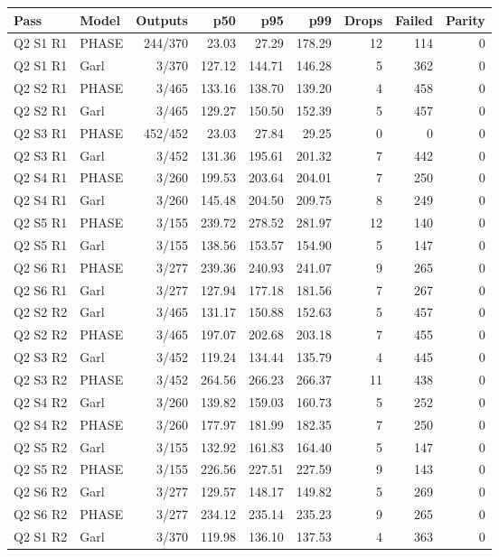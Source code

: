 \begin{longtable}{llrrrrrrr}
\toprule
Pass & Model & Outputs & p50 & p95 & p99 & Drops & Failed & Parity \\
\midrule
\endhead
Q2 S1 R1 & PHASE & 244/370 & 23.03 & 27.29 & 178.29 & 12 & 114 & 0 \\
Q2 S1 R1 & Garl & 3/370 & 127.12 & 144.71 & 146.28 & 5 & 362 & 0 \\
Q2 S2 R1 & PHASE & 3/465 & 133.16 & 138.70 & 139.20 & 4 & 458 & 0 \\
Q2 S2 R1 & Garl & 3/465 & 129.27 & 150.50 & 152.39 & 5 & 457 & 0 \\
Q2 S3 R1 & PHASE & 452/452 & 23.03 & 27.84 & 29.25 & 0 & 0 & 0 \\
Q2 S3 R1 & Garl & 3/452 & 131.36 & 195.61 & 201.32 & 7 & 442 & 0 \\
Q2 S4 R1 & PHASE & 3/260 & 199.53 & 203.64 & 204.01 & 7 & 250 & 0 \\
Q2 S4 R1 & Garl & 3/260 & 145.48 & 204.50 & 209.75 & 8 & 249 & 0 \\
Q2 S5 R1 & PHASE & 3/155 & 239.72 & 278.52 & 281.97 & 12 & 140 & 0 \\
Q2 S5 R1 & Garl & 3/155 & 138.56 & 153.57 & 154.90 & 5 & 147 & 0 \\
Q2 S6 R1 & PHASE & 3/277 & 239.36 & 240.93 & 241.07 & 9 & 265 & 0 \\
Q2 S6 R1 & Garl & 3/277 & 127.94 & 177.18 & 181.56 & 7 & 267 & 0 \\
Q2 S2 R2 & Garl & 3/465 & 131.17 & 150.88 & 152.63 & 5 & 457 & 0 \\
Q2 S2 R2 & PHASE & 3/465 & 197.07 & 202.68 & 203.18 & 7 & 455 & 0 \\
Q2 S3 R2 & Garl & 3/452 & 119.24 & 134.44 & 135.79 & 4 & 445 & 0 \\
Q2 S3 R2 & PHASE & 3/452 & 264.56 & 266.23 & 266.37 & 11 & 438 & 0 \\
Q2 S4 R2 & Garl & 3/260 & 139.82 & 159.03 & 160.73 & 5 & 252 & 0 \\
Q2 S4 R2 & PHASE & 3/260 & 177.97 & 181.99 & 182.35 & 7 & 250 & 0 \\
Q2 S5 R2 & Garl & 3/155 & 132.92 & 161.83 & 164.40 & 5 & 147 & 0 \\
Q2 S5 R2 & PHASE & 3/155 & 226.56 & 227.51 & 227.59 & 9 & 143 & 0 \\
Q2 S6 R2 & Garl & 3/277 & 129.57 & 148.17 & 149.82 & 5 & 269 & 0 \\
Q2 S6 R2 & PHASE & 3/277 & 234.12 & 235.14 & 235.23 & 9 & 265 & 0 \\
Q2 S1 R2 & Garl & 3/370 & 119.98 & 136.10 & 137.53 & 4 & 363 & 0 \\

\end{longtable}

